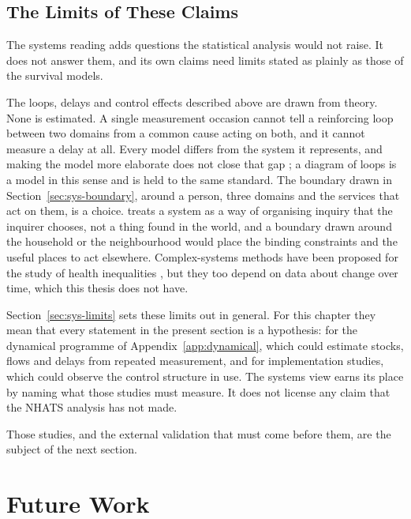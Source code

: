 \subsection{The Limits of These Claims}
\label{sec:disc-sys-limits}

The systems reading adds questions the statistical analysis would not raise. It
does not answer them, and its own claims need limits stated as plainly as those of
the survival models.

The loops, delays and control effects described above are drawn from theory. None
is estimated. A single measurement occasion cannot tell a reinforcing loop between
two domains from a common cause acting on both, and it cannot measure a delay at
all. Every model differs from the system it represents, and making the model more
elaborate does not close that gap \citep{box_1976}; a diagram of loops is a model in
this sense and is held to the same standard. The boundary drawn in
Section~\ref{sec:sys-boundary}, around a person, three domains and the services that
act on them, is a choice. \citet{checkland_1981} treats a system as a way of
organising inquiry that the inquirer chooses, not a thing found in the world, and a
boundary drawn around the household or the neighbourhood would place the binding
constraints and the useful places to act elsewhere. Complex-systems methods have
been proposed for the study of health inequalities \citep{diez_roux_2011}, but they
too depend on data about change over time, which this thesis does not have.

Section~\ref{sec:sys-limits} sets these limits out in general. For this chapter
they mean that every statement in the present section is a hypothesis: for the
dynamical programme of Appendix~\ref{app:dynamical}, which could estimate stocks,
flows and delays from repeated measurement, and for implementation studies, which
could observe the control structure in use. The systems view earns its place by
naming what those studies must measure. It does not license any claim that the
NHATS analysis has not made.

Those studies, and the external validation that must come before them, are the
subject of the next section.

\section{Future Work}
\label{sec:disc-future}

